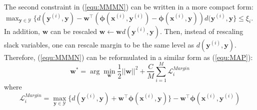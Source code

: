 The second constraint in (\ref{equ:MMMN}) can be written in a more compact form: 
$\max_{\mathbf{y}\in\mathcal{Y}} \{d(\mathbf{y}^{(i)},\mathbf{y})-{\mathbf{w}^\top} (\boldsymbol{\phi}(\mathbf{x}^{(i)},\mathbf{y}^{(i)})-\boldsymbol{\phi} 
        (\mathbf{x}^{(i)},\mathbf{y})) d(\mathbf{y}^{(i)},\mathbf{y}\}\leq \xi_i$. 
In addition, $\mathbf{w}$ can be rescaled $\mathbf{w}\gets \mathbf{w}d(\mathbf{y}^{(i)},\mathbf{y})$. 
Then, instead of rescaling slack variables, one can rescale margin to be the same level as 
$d(\mathbf{y}^{(i)},\mathbf{y})$.  
Therefore, (\ref{equ:MMMN}) can be reformulated in a similar form as (\ref{equ:MAP}):
\begin{equation}
        \mathbf{w}^* = \arg\min_{\mathbf{w}} \frac{1}{2} ||\mathbf{w}||^2+ \frac{C}{M}\sum_{i=1}^M \mathcal{L}^{Margin}_i 
    \label{equ:MMMN_compact}
\end{equation}
where 
\begin{equation} 
    \mathcal{L}^{Margin}_i=\max_{\mathbf{y}\in\mathcal{Y}} \{d(\mathbf{y}^{(i)},\mathbf{y})+ \mathbf{w}^\top\boldsymbol{\phi} 
        (\mathbf{x}^{(i)},\mathbf{y})\} -\mathbf{w}^\top\boldsymbol{\phi}(\mathbf{x}^{(i)},\mathbf{y}^{(i)})
\label{equ:MMMN_loss}
\end{equation}




